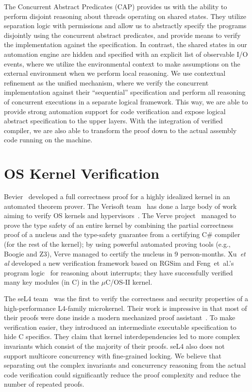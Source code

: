 The Concurrent Abstract Predicates (CAP) \cite{CAP2010} provides us with the ability
to perform disjoint reasoning about threads operating on shared states.
They utilize separation logic with permissions and allow us to abstractly
specify the programs disjointly using the concurrent abstract predicates,
and provide means to verify the implementation against the specification.
In contrast, the shared states in our automation engine are hidden and specified
with an explicit list of observable I/O events, where we utilize the environmental
context to make assumptions on the external environment when we perform local reasoning.
We use contextual refinement as the unified mechanism, where we verify
the concurrent implementation against their ``sequential'' specification
and perform all reasoning
of concurrent executions in a separate logical framework.
This way, we are able to provide strong automation support for code verification
and expose logical abstract specification to the upper layers.
With the integration of verified compiler, we are also able to transform the
proof down to the actual assembly code running on the machine.


\section{OS Kernel Verification}

Bevier~\cite{bevier89} developed a full correctness proof
for a highly idealized kernel in an automated theorem prover. The
Verisoft team~\cite{verisoft07} has done a large body of work aiming
to verify OS kernels and
hypervisors~\cite{leinenbach09,alkassar10}. The Verve
project~\cite{hawblitzel10} managed to prove the type safety of an
entire kernel by combining the partial correctness proof of a nucleus
and the type-safety guarantee from a certifying C\# compiler (for the
rest of the kernel); by using powerful automated proving tools (e.g.,
Boogie and Z3), Verve managed to certify the nucleus in 9
person-months.
Xu~{\em et al} \cite{xu16} developed a new verification framework based on RGSim
and Feng~{et~al.}'s program logic~\cite{feng08:aim} for reasoning
about interrupts; they have successfully verified many key modules
(in C) in the $\mu$C/OS-II kernel.

The seL4 team~\cite{klein2009sel4} was the first to verify the
correctness and security properties of a high-performance L4-family
microkernel. Their work is impressive in that most of their proofs
were done inside a modern mechanized proof
assistant~\cite{Paulson:Isabelle}.  To make verification easier, they
introduced an intermediate executable specification to hide C
specifics. They claim that kernel
interdependencies led to more complex invariants which consist
of the majority of their proofs. seL4 also does not support multicore
concurrency with fine-grained locking. 
We believe that separating out the complex invariants and concurrency
reasoning from the actual code verification could significantly reduce
the proof complexity and reduce the number of repeated proofs.

